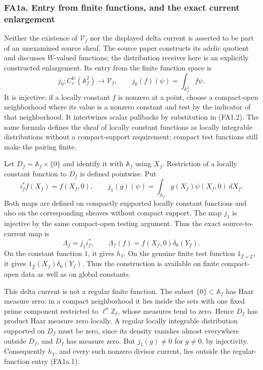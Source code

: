 \subsubsection{FA1a. Entry from finite functions, and the exact current
enlargement}\label{fa1a.-entry-from-finite-functions-and-the-exact-current-enlargement}

Neither the existence of \(\mathscr V_f\) nor the displayed delta
current is asserted to be part of an unexamined source sheaf. The source
paper constructs its adelic quotient and discusses \(W\)-valued
functions; the distribution receiver here is an explicitly constructed
enlargement. Its entry from the finite function space is \[
 j_0:C_c^{\mathrm{lc}}(\mathbb A_f^2)\longrightarrow
       \mathscr V_f,\qquad
 j_0(f)(\psi)=\int_{\mathbb A_f^2}f\psi.
\tag{FA1a.1}
\] It is injective: if a locally constant \(f\) is nonzero at a point,
choose a compact-open neighborhood where its value is a nonzero constant
and test by the indicator of that neighborhood. It intertwines scalar
pullbacks by substitution in (FA1.2). The same formula defines the sheaf
of locally constant functions as locally integrable distributions
without a compact-support requirement; compact test functions still make
the pairing finite.

Let \(D_f=\mathbb A_f\times\{0\}\) and identify it with \(\mathbb A_f\)
using \(X_f\). Restriction of a locally constant function to \(D_f\) is
defined pointwise. Put \[
 i_f^*f(X_f)=f(X_f,0),\qquad
 j_1(g)(\psi)=\int_{\mathbb A_f}g(X_f)\psi(X_f,0)\,dX_f.
\tag{FA1a.2}
\] Both maps are defined on compactly supported locally constant
functions and also on the corresponding sheaves without compact support.
The map \(j_1\) is injective by the same compact-open testing argument.
Thus the exact source-to-current map is \[
 \Lambda_f=j_1 i_f^*,\qquad
 \Lambda_f(f)=f(X_f,0)\delta_0(Y_f).
\tag{FA1a.3}
\] On the constant function \(1\), it gives \(h_1\). On the genuine
finite test function
\(1_{\widehat{\mathbb Z}\times\widehat{\mathbb Z}}\), it gives
\(1_{\widehat{\mathbb Z}}(X_f)\delta_0(Y_f)\). Thus the construction is
available on finite compact-open data as well as on global constants.

This delta current is not a regular finite function. The subset
\(\{0\}\subset\mathbb A_f\) has Haar measure zero: in a compact
neighborhood it lies inside the sets with one fixed prime component
restricted to \(\ell^n\mathbb Z_\ell\), whose measures tend to zero.
Hence \(D_f\) has product Haar measure zero locally. A regular locally
integrable distribution supported on \(D_f\) must be zero, since its
density vanishes almost everywhere outside \(D_f\), and \(D_f\) has
measure zero. But \(j_1(g)\ne0\) for \(g\ne0\), by injectivity.
Consequently \(h_1\), and every such nonzero divisor current, lies
outside the regular-function entry (FA1a.1).

